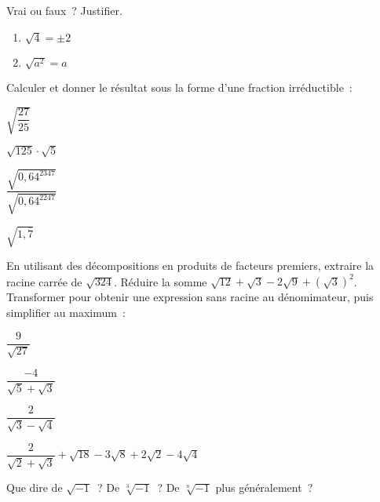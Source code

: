 \documentclass[a4paper,12pt]{article}
\begin{document}
\begin{activite}
	\tcblower
\begin{tasks}
	\task Vrai ou faux~? Justifier.
\begin{multicols}{2}
\begin{enumerate}
	\item $\sqrt{4}=\pm 2$
\item $\sqrt{a^2}=a$
\end{enumerate}
\end{multicols}	
	\task Calculer et donner le résultat sous la forme d'une fraction irréductible~:

\begin{inlineumerate}
\item $\sqrt{\dfrac{27}{25}}$\hspace{24pt}
		\item $\sqrt{125}\cdot \sqrt{5}$\hspace{24pt}
		\item $\dfrac{\sqrt{0,64^2347}}{\sqrt{0,64^2247}}$\hspace{24pt}
		\item $\sqrt{1,\overline{7}}$\hspace{24pt}
	\end{inlineumerate}
\task En utilisant des décompositions en produits de facteurs premiers, extraire la racine carrée de $\sqrt{324}$.
\task Réduire la somme $\sqrt{12}+\sqrt{3}-2\sqrt{9}+(\sqrt{3})^2$.
\task Transformer pour obtenir une expression sans racine au dénomimateur, puis simplifier au maximum~:

\begin{inlineumerate}
\item \(\dfrac{9}{\sqrt{27}}\)\hspace{24pt}
  \item \(\dfrac{-4}{\sqrt{5} + \sqrt{3}}\)\hspace{24pt}
  \item \(\dfrac{2}{\sqrt{3} - \sqrt{4}}\)\hspace{24pt}
  \item \(\dfrac{2}{\sqrt{2} + \sqrt{3}} + \sqrt{18} - 3\sqrt{8} + 2\sqrt{2} - 4\sqrt{4}\)\hspace{24pt}
\end{inlineumerate}
\task Que dire de $\sqrt{-1}$~? De $\sqrt[3]{-1}$~? De $\sqrt[n]{-1}$ plus généralement~?
\end{tasks}
\end{activite}
\end{document}

